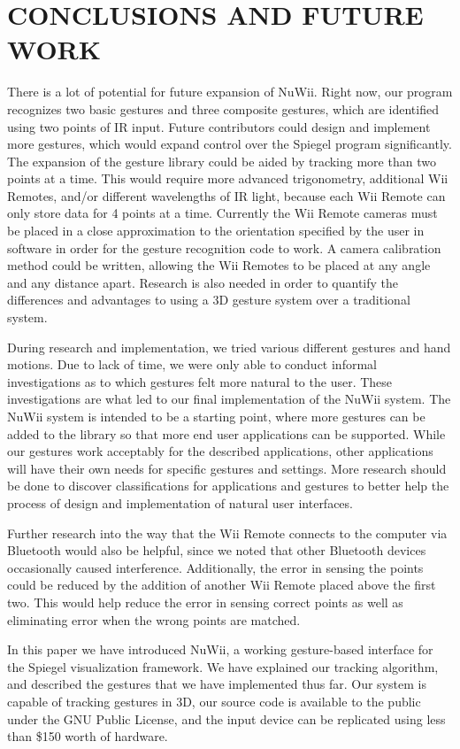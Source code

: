 \documentclass[a4paper,twoside]{article}
\begin{document}
\section{\uppercase{Conclusions and Future Work}} There is a lot of potential
for future expansion of NuWii. Right now, our program recognizes two basic
gestures and three composite gestures, which are identified using two points of
IR input. Future contributors could design and implement more gestures, which
would expand control over the Spiegel program significantly. The expansion of
the gesture library could be aided by tracking more than two points at a time.
This would require more advanced trigonometry, additional Wii Remotes, and/or
different wavelengths of IR light, because each Wii Remote can only store data
for 4 points at a time. Currently the Wii Remote cameras must be placed in a
close approximation to the orientation specified by the user in software in
order for the gesture recognition code to work. A camera calibration method
could be written, allowing the Wii Remotes to be placed at any angle and any
distance apart.  Research is also needed in order to quantify the differences
and advantages to using a 3D gesture system over a traditional system. 

During research and implementation, we tried various different gestures and
hand motions. Due to lack of time, we were only able to conduct informal
investigations as to which gestures felt more natural to the user. These
investigations are what led to our final implementation of the NuWii system.
The NuWii system is intended to be a starting point, where more gestures can be
added to the library so that more end user applications can be supported. While
our gestures work acceptably for the described applications, other applications
will have their own needs for specific gestures and settings. More research
should be done to discover classifications for applications and gestures to
better help the process of design and implementation of natural user
interfaces.

Further research into the way that the Wii Remote connects to the
computer via Bluetooth would also be helpful, since we noted that other
Bluetooth devices occasionally caused interference. Additionally, the error in
sensing the points could be reduced by the addition of another Wii Remote placed
above the first two. This would help reduce the error in sensing correct points
as well as eliminating error when the wrong points are matched.

In this paper we have introduced NuWii, a working gesture-based interface for
the Spiegel visualization framework. We have explained our tracking algorithm,
and described the gestures that we have implemented thus far. Our system is
capable of tracking gestures in 3D, our source code is available to the public
under the GNU Public License, and the input device can be replicated using less
than \$150 worth of hardware. 
    
\end{document}
